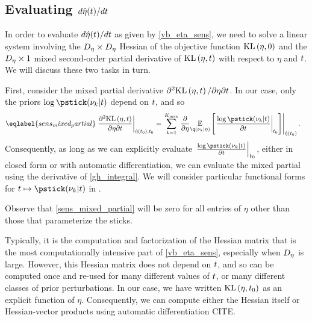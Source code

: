 
\subsection{Evaluating $d\hat\eta(t) / dt$}

In order to evaluate $d\hat\eta(t) / dt$ as given by \eqref{vb_eta_sens}, we
need to solve a linear system involving the ${D_{\eta}} \times {D_{\eta}}$ Hessian of
the objective function $\mathrm{KL}\left(\eta, 0\right)$ and the ${D_{\eta}} \times 1$ mixed
second-order partial derivative of $\mathrm{KL}\left(\eta, t\right)$ with respect to $\eta$ and
$t$.  We will discuss these two tasks in turn.

First, consider the mixed partial derivative $\partial^2 \mathrm{KL}\left(\eta, t\right) /
\partial \eta \partial t$.  In our case, only the priors $\log \pstick(\nuk
\vert \t)$ depend on $t$, and so
%
\begin{align}\eqlabel{sens_mixed_partial}
%
\fracat{\partial^2 \KL{\eta, \t}}
       {\partial \eta \partial \t}
       {\etaopt(\t_0), \t_0} ={}&
\sum_{\k=1}^{\kmax}
    \evalat{
        \frac{\partial}{\partial\eta}
        \expect{\q(\nuk \vert \eta)}
               {\fracat{\log \pstick(\nuk \vert \t)}{\partial \t}{\t_0}
               }
        }
        {\etaopt(\t_0)}.
%
\end{align}
%
Consequently, as long as we can explicitly evaluate $\fracat{\log \pstick(\nuk
\vert \t)}{\partial \t}{\t_0} $, either in closed form or with automatic
differentiation, we can evaluate the mixed partial using the derivative of
\eqref{gh_integral}.  We will consider particular functional forms for
$\t \mapsto \pstick(\nuk \vert \t)$ in .

Observe that \eqref{sens_mixed_partial} will be zero for all entries of
$\eta$ other than those that parameterize the sticks.

Typically, it is the computation and factorization of the Hessian matrix that is
the most computationally intensive part of \eqref{vb_eta_sens}, especially when
${D_{\eta}}$ is large.  However, this Hessian matrix does not depend on $t$, and
so can be computed once and re-used for many different values of $t$, or many
different classes of prior perturbations.  In our case, we have written
$\mathrm{KL}\left(\eta, t_0\right)$ as an explicit function of $\eta$.  Consequently, we can
compute either the Hessian itself or Hessian-vector products using automatic
differentiation CITE.

